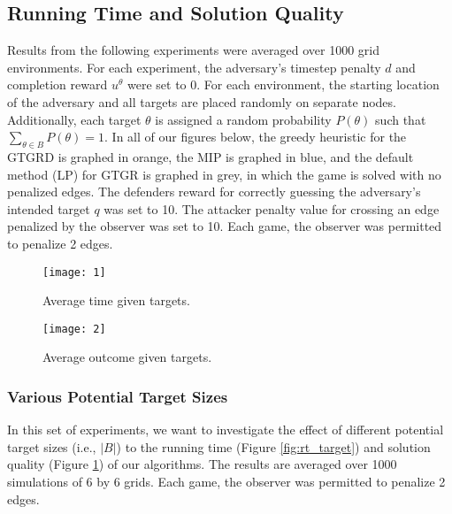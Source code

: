 \subsection{Running Time and Solution Quality}
Results from the following experiments were averaged over 1000 grid environments. 
For each experiment, the adversary's timestep penalty $d$ and completion reward $u^{\theta}$ were set to 0. 
For each environment, the starting location of the adversary and all targets are placed 
randomly on separate nodes. 
Additionally, each target $\theta$ is assigned a random probability $P(\theta)$ such 
that $\sum_{\theta \in B} P(\theta) = 1$. 
In all of our figures below, the greedy heuristic for the GTGRD is graphed in orange, 
the MIP is graphed in blue, 
and the default method (LP) for GTGR is graphed in grey, 
in which the game is solved with no penalized edges.
The defenders reward for correctly guessing the adversary's intended target $q$ was set to 10. 
The attacker penalty value for crossing an edge penalized by the observer was set to 10. 
Each game, the observer was permitted to penalize 2 edges.

\begin{figure}[!ht]
\begin{center}
\begin{minipage}{0.48\linewidth}
\texttt{[image: 1]}
\caption{Average time given targets.}
\label{fig:rt_target}
\end{minipage}%
\hfill
\begin{minipage}{0.49\linewidth}
\texttt{[image: 2]}
\caption{Average outcome given targets.}
\label{fig:sol_target}
\end{minipage}
\end{center}
\end{figure}

\subsubsection{Various Potential Target Sizes}
In this set of experiments, we want to investigate 
the effect of different potential target sizes (i.e., $|B|$) 
to the running time (Figure \ref{fig:rt_target}) 
and solution quality (Figure \ref{fig:sol_target}) of our algorithms. 
The results are averaged over 1000 simulations of 6 by 6 grids. 
Each game, the observer was permitted to penalize 2 edges. 

